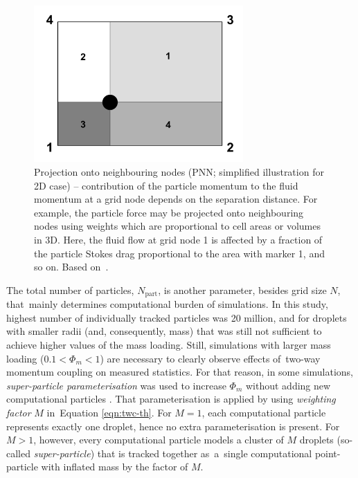\documentclass{pracamgren}
\begin{document}
\begin{figure}[h]
\centering
\includegraphics[width=8cm]{img/figs/pnn.pdf}
\caption{
Projection onto neighbouring nodes (PNN; simplified illustration for 2D case) -- contribution of the particle momentum to the fluid momentum at a grid node depends on the separation distance. For example, the particle force may be projected onto neighbouring nodes using weights which are proportional to cell areas or volumes in 3D. Here, the fluid flow at grid node 1 is affected by a fraction of the particle Stokes drag proportional to the area with marker 1, and so on. Based on~\textcite[Fig. 1]{Garg2007}.}
\label{fig:pnn}
\end{figure}

\medskip

The total number of particles, $N_{\text{part}}$, is another parameter, besides grid size $N$, that~mainly determines computational burden of simulations.
In this study, highest number of individually tracked particles was 20 million, and for droplets with smaller radii (and, consequently, mass) that was still not sufficient to achieve higher values of the mass loading.
Still, simulations with larger mass loading ($0.1 < \Phi_{m} < 1$) are necessary to clearly observe effects of~two-way momentum coupling on measured statistics.
For that reason, in some simulations, \emph{super-particle parameterisation} was used to increase $\Phi_m$ without adding new computational particles \parencite{Elghobashi1994}.
That parameterisation is applied by using \emph{weighting factor} $M$ in~Equation \ref{eqn:twc-th}.
For $M=1$, each computational particle represents exactly one droplet, hence no extra parameterisation is present.
For $M > 1$, however, every computational particle models a cluster of $M$ droplets (so-called \emph{super-particle}) that is tracked together as~a~single computational point-particle with inflated mass by the factor of $M$.
\end{document}
